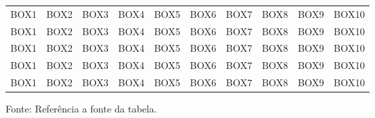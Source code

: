\begin{landscape}
\begin{longtable}[c]{c|c|c|c|c|c|c|c|c|c}
	BOX1 & BOX2 & BOX3 & BOX4 & BOX5 & BOX6 &	BOX7 & BOX8 & BOX9 & BOX10 \\
	BOX1 & BOX2 & BOX3 & BOX4 & BOX5 & BOX6 &	BOX7 & BOX8 & BOX9 & BOX10 \\
	BOX1 & BOX2 & BOX3 & BOX4 & BOX5 & BOX6 &	BOX7 & BOX8 & BOX9 & BOX10 \\
	BOX1 & BOX2 & BOX3 & BOX4 & BOX5 & BOX6 &	BOX7 & BOX8 & BOX9 & BOX10 \\
	BOX1 & BOX2 & BOX3 & BOX4 & BOX5 & BOX6 &	BOX7 & BOX8 & BOX9 & BOX10 \\
\hline
\end{longtable}
\vspace{-8mm}
\begin{center}
	Fonte: Referência a fonte da tabela.
\end{center}
\end{landscape}